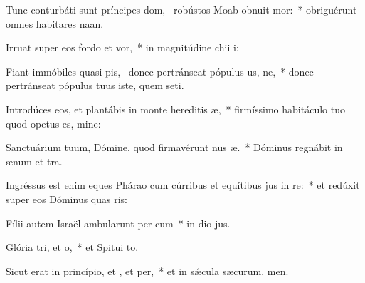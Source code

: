 \item Tunc conturbáti sunt príncipes dom,~\pscross{} robústos Moab obnuit mor:~* obriguérunt omnes habitares naan.
\item Irruat super eos fordo et vor,~* in magnitúdine chii i:
\item Fiant immóbiles quasi pis,~\pscross{} donec pertránseat pópulus us, ne,~* donec pertránseat pópulus tuus iste, quem seti.
\item Introdúces eos, et plantábis in monte hereditis æ,~* firmíssimo habitáculo tuo quod opetus es, mine:
\item Sanctuárium tuum, Dómine, quod firmavérunt nus æ.~* Dóminus regnábit in ænum et tra.
\item Ingréssus est enim eques Phárao cum cúrribus et equítibus jus in re:~* et redúxit super eos Dóminus quas ris:
\item Fílii autem Israël ambularunt per cum~* in dio jus.
\item Glória tri, et o,~* et Spitui to.
\item Sicut erat in princípio, et , et per,~* et in sǽcula sæcurum. men.
